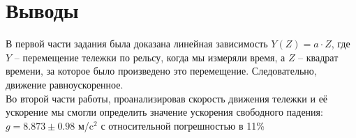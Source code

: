 \documentclass[12pt,a4paper]{article}
\begin{document}
\section{Выводы}
В первой части задания была доказана линейная зависимость $Y(Z)=a\cdot Z$, где $Y$ – перемещение тележки по рельсу, когда мы измеряли время, а $Z$ – квадрат времени, за которое было произведено это перемещение. Следовательно, движение равноускоренное. \\
\hfill\break
Во второй части работы, проанализировав скорость движения тележки и её ускорение мы смогли определить значение ускорения свободного падения: $g=8.873\pm0.98$ м/c$^2$ с относительной погрешностью в 11\% \\
\end{document}
